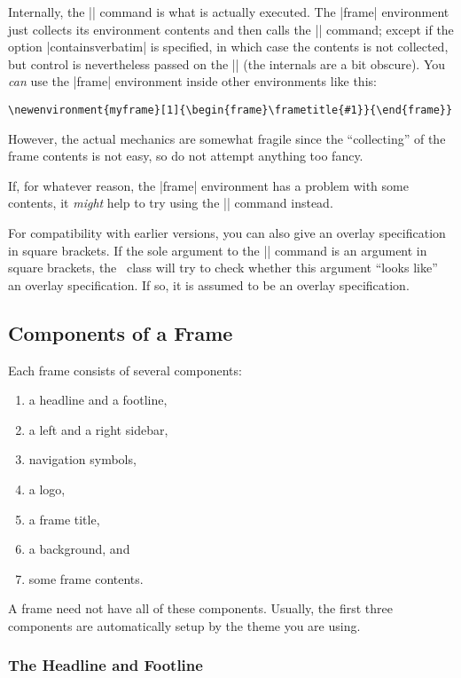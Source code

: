Internally, the |\frame| command is what is actually executed. The
|frame| environment just collects its environment contents and then
calls the |\frame| command; except if the option |containsverbatim|
is specified, in which case the contents is not collected, but
control is nevertheless passed on the |\frame| (the internals are a
bit obscure). You \emph{can} use the |frame| environment inside other
environments like this:
\begin{verbatim}
\newenvironment{myframe}[1]{\begin{frame}\frametitle{#1}}{\end{frame}}
\end{verbatim}
However, the actual mechanics are somewhat fragile since the
``collecting'' of the frame contents is not easy, so
do not attempt anything too fancy.

If, for whatever reason, the |frame| environment has a problem with
some contents, it \emph{might} help to try using the |\frame|
command instead.

For compatibility with earlier versions, you can also give an overlay
specification in square brackets. If the sole argument to the |\frame|
command is an argument in square brackets, the \beamer\ class will try
to check whether this argument ``looks like'' an overlay
specification. If so, it is assumed to be an overlay specification.



\subsection{Components of a Frame}

Each frame consists of several components:
\begin{enumerate}\itemsep=0pt\parskip=0pt
\item a headline and a footline,
\item a left and a right sidebar,
\item navigation symbols,
\item a logo,
\item a frame title, 
\item a background, and
\item some frame contents.
\end{enumerate}

A frame need not have all of these components. Usually, the first
three components are automatically setup by the theme you are using. 


\subsubsection{The Headline and Footline}

